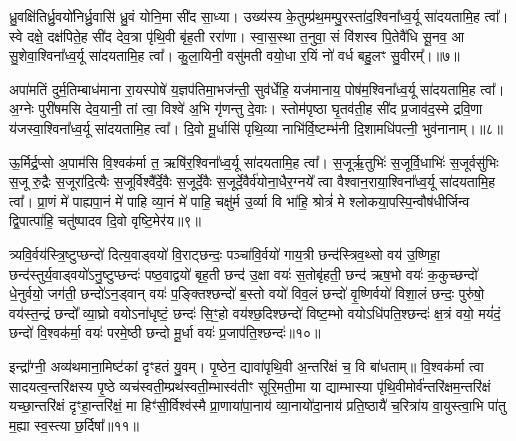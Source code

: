 {\anuvakamend[{विट्प॑ष्ठ॒वाड्वयो॒\-ऽष्टाविꣳ॑शतिश्च॥३॥}]}

ध्रु॒वक्षि॑तिर्ध्रु॒वयो॑निर्ध्रु॒वासि॑ ध्रु॒वं योनि॒मा सी॑द सा॒ध्या। उख्य॑स्य के॒तुम्प्र॑थ॒मम्पु॒रस्ता॑द॒श्विना᳚ध्व॒र्यू सा॑दयतामि॒ह त्वा᳚। स्वे दक्षे॒ दक्ष॑पिते॒ह सी॑द देव॒त्रा पृ॑थि॒वी बृ॑ह॒ती ररा॑णा। स्वा॒स॒स्था त॒नुवा॒ सं वि॑शस्व पि॒तेवै॑धि सू॒नव॒ आ सु॒शेवा॒श्विना᳚ध्व॒र्यू सा॑दयतामि॒ह त्वा᳚। कु॒ला॒यिनी॒ वसु॑मती वयो॒धा र॒यिं नो॑ वर्ध बहु॒लꣳ सु॒वीरम्᳚।॥७॥

अपा॑मतिं दुर्म॒तिम्बाध॑माना रा॒यस्पोषे॑ य॒ज्ञप॑तिमा॒भज॑न्ती॒ सुव॑र्धेहि॒ यज॑मानाय॒ पोष॑म॒श्विना᳚ध्व॒र्यू सा॑दयतामि॒ह त्वा᳚। अ॒ग्नेः पुरी॑षमसि देव॒यानी॒ तां त्वा॒ विश्वे॑ अ॒भि गृ॑णन्तु दे॒वाः। स्तोम॑पृष्ठा घृ॒तव॑ती॒ह सी॑द प्र॒जाव॑द॒स्मे द्रवि॒णा य॑जस्वा॒श्विना᳚ध्व॒र्यू सा॑दयतामि॒ह त्वा᳚। दि॒वो मू॒र्धासि॑ पृथि॒व्या नाभि॑र्वि॒ष्टम्भ॑नी दि॒शामधि॑पत्नी॒ भुव॑नानाम्।॥८॥

ऊ॒र्मिर्द्र॒प्सो अ॒पाम॑सि वि॒श्वक॑र्मा त॒ ऋषि॑र॒श्विना᳚ध्व॒र्यू सा॑दयतामि॒ह त्वा᳚। स॒जूर्\mbox{}ऋ॒तुभिः॑ स॒जूर्वि॒धाभिः॑ स॒जूर्वसु॑भिः स॒जू रु॒द्रैः स॒जूरा॑दि॒त्यैः स॒जूर्विश्वै᳚र्दे॒वैः स॒जूर्दे॒वैः स॒जूर्दे॒वैर्व॑योना॒धैर॒ग्नये᳚ त्वा वैश्वान॒राया॒श्विना᳚ध्व॒र्यू सा॑दयतामि॒ह त्वा᳚। प्रा॒णं मे॑ पाह्यपा॒नं मे॑ पाहि व्या॒नं मे॑ पाहि॒ चक्षु॑र्म उ॒र्व्या वि भा॑हि॒ श्रोत्रं॑ मे श्लोकया॒पस्पि॒न्वौष॑धीर्जिन्व द्वि॒पात्पा॑हि॒ चतु॑ष्पादव दि॒वो वृष्टि॒मेर॑य॥९॥

{\anuvakamend[{सु॒वीरं॒ भुव॑नानामु॒र्व्या स॒प्तद॑श च॥४॥}]}

त्र्यवि॒र्वय॑स्त्रि॒ष्टुप्छन्दो॑ दित्य॒वाड्वयो॑ वि॒राट्छन्दः॒ पञ्चा॑वि॒र्वयो॑ गाय॒त्री छन्द॑स्त्रिव॒थ्सो वय॑ उ॒ष्णिहा॒ छन्द॑स्तुर्य॒वाड्वयो॑\-ऽ\-नु॒ष्टुप्छन्दः॑ पष्ठ॒वाद्वयो॑ बृह॒ती छन्द॑ उ॒क्षा वयः॑ स॒तोबृ॑हती॒ छन्द॑ ऋष॒भो वयः॑ क॒कुच्छन्दो॑ धे॒नुर्वयो॒ जग॑ती॒ छन्दो॑\-ऽ\-न॒ड्वान् वयः॑ प॒ङ्क्तिश्छन्दो॑ ब॒स्तो वयो॑ विव॒लं छन्दो॑ वृ॒ष्णिर्वयो॑ विशा॒लं छन्दः॒ पुरु॑षो॒ वय॑स्त॒न्द्रं छन्दो᳚ व्या॒घ्रो वयो\-ऽ\-ना॑धृष्टं॒ छन्दः॑ सि॒ꣳ॒हो वय॑श्छ॒दिश्छन्दो॑ विष्ट॒म्भो वयो\-ऽधि॑पति॒श्छन्दः॑ क्ष॒त्रं वयो॒ मयं॑दं॒ छन्दो॑ वि॒श्वक॑र्मा॒ वयः॑ परमे॒ष्ठी छन्दो मू॒र्धा वयः॑ प्र॒जाप॑ति॒श्छन्दः॑॥१०॥

{\anuvakamend[{पुरु॑षो॒ वय॒ष्षड्विꣳ॑शतिश्च॥५॥}]}

इन्द्रा᳚ग्नी॒ अव्य॑थमाना॒मिष्ट॑कां दृꣳहतं यु॒वम्। पृ॒ष्ठेन॒ द्यावा॑पृथि॒वी अ॒न्तरि॑क्षं च॒ वि बा॑धताम्॥ वि॒श्वक॑र्मा त्वा सादयत्व॒न्तरि॑क्षस्य पृ॒ष्ठे व्यच॑स्वती॒म्प्रथ॑स्वती॒म्भास्व॑तीꣳ सूरि॒मती॒मा या द्याम्भास्या पृ॑थि॒वीमोर्व॑न्तरि॑क्षम॒न्तरि॑क्षं यच्छा॒न्तरि॑क्षं दृꣳहा॒न्तरि॑क्षं॒ मा हिꣳ॑सी॒र्विश्व॑स्मै प्रा॒णाया॑पा॒नाय॑ व्या॒नायो॑दा॒नाय॑ प्रति॒ष्ठायै॑ च॒रित्रा॑य वा॒युस्त्वा॒भि पा॑तु म॒ह्या स्व॒स्त्या छ॒र्दिषा᳚॥११॥


